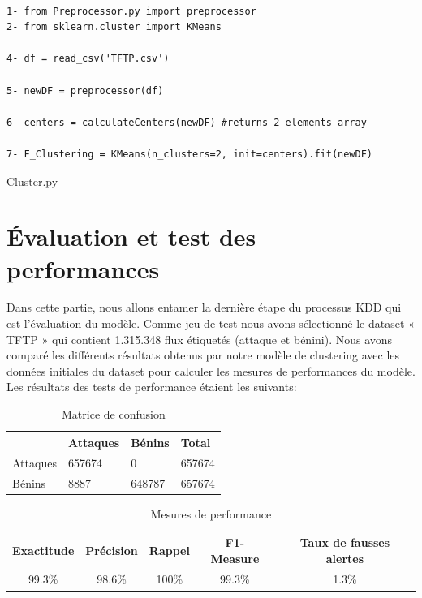\begin{algorithm}[H]
\begin{verbatim}

1- from Preprocessor.py import preprocessor 
2- from sklearn.cluster import KMeans

4- df = read_csv('TFTP.csv')

5- newDF = preprocessor(df)

6- centers = calculateCenters(newDF) #returns 2 elements array

7- F_Clustering = KMeans(n_clusters=2, init=centers).fit(newDF) 

\end{verbatim}
\caption{Cluster.py}
\end{algorithm}

\section{Évaluation et test des performances}
\label{tests}
Dans cette partie, nous allons entamer la dernière étape du processus KDD qui est l'évaluation du modèle. Comme jeu de test nous avons sélectionné le dataset « TFTP » qui contient 1.315.348 flux étiquetés (attaque et bénini). Nous avons comparé les différents résultats obtenus par notre modèle de clustering avec les données initiales du dataset pour calculer les mesures de performances du modèle.\\

\noindent Les résultats des tests de performance étaient les suivants: 

\begin{table}[h]
	\begin{center}
		\begin{tabular}{  | m{2.5cm} | m{2.5cm} | m{2.5cm} || m{2cm} | }
			\hline
			  & Attaques & Bénins & Total\\
			\hline
			Attaques & 657674 & 0 & 657674\\
			\hline
			Bénins & 8887 & 648787 & 657674\\
			\hline
		\end{tabular}
		\caption{Matrice de confusion}
	\end{center}
	\label{table:re}
\end{table}

\begin{table}[h]
	\begin{center}
		\begin{tabular}{  | c | c | c | c | c | }
			\hline
			\rowcolor[rgb]{0.85,0.85,0.85}
			 Exactitude & Précision & Rappel & F1-Measure & Taux de fausses alertes\\
			\hline
			99.3\% & 98.6\% & 100\% & 99.3\% & 1.3\%\\
			\hline
		\end{tabular}
		\caption{Mesures de performance }
	\end{center}
	\label{table:F_Clustering_Evaluation}
\end{table}

